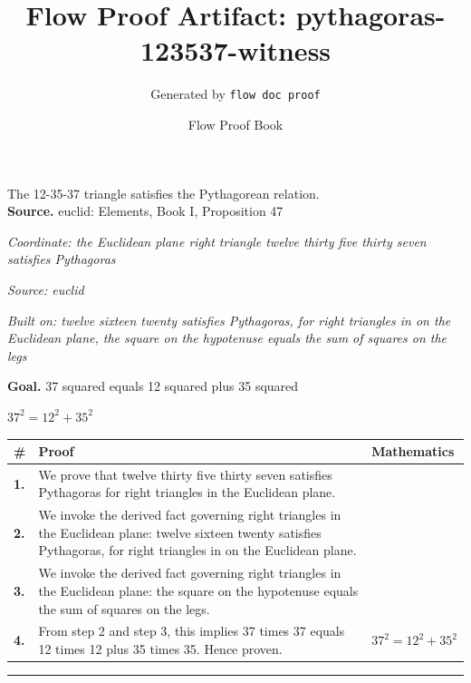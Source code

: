 \documentclass[11pt]{article}
\title{Flow Proof Artifact: pythagoras-123537-witness}
\author{Generated by \texttt{flow doc proof}}
\date{Flow Proof Book}
\theoremstyle{definition}
\begin{document}
\maketitle
The 12-35-37 triangle satisfies the Pythagorean relation.\\[0.5em]
\textbf{Source.} euclid: Elements, Book I, Proposition 47\\[0.5em]
\bigskip
{}\par
\smallskip\noindent\textit{Coordinate: the Euclidean plane \cdot right triangle \cdot twelve thirty five thirty seven satisfies Pythagoras}\par
\smallskip\noindent\textit{Source: euclid}\par
\smallskip\noindent\textit{Built on: twelve sixteen twenty satisfies Pythagoras, for right triangles in on the Euclidean plane, the square on the hypotenuse equals the sum of squares on the legs}\par
\medskip
\noindent\textbf{Goal.} 37 squared equals 12 squared plus 35 squared\par
\noindent$\displaystyle 37^{2} = 12^{2} + 35^{2}$\par
\medskip
\noindent
\begin{tabular}{@{} >{\raggedright\arraybackslash}p{} >{\raggedright\arraybackslash}p{} >{\raggedleft\arraybackslash}p{} @{}}
\textbf{\#} & \textbf{Proof} & \textbf{Mathematics} \\
\midrule
\textbf{1.} & We prove that twelve thirty five thirty seven satisfies Pythagoras for right triangles in the Euclidean plane. & \\[0.45em]
\textbf{2.} & We invoke the derived fact governing right triangles in the Euclidean plane: twelve sixteen twenty satisfies Pythagoras, for right triangles in on the Euclidean plane. & \\[0.45em]
\textbf{3.} & We invoke the derived fact governing right triangles in the Euclidean plane: the square on the hypotenuse equals the sum of squares on the legs. & \\[0.45em]
\textbf{4.} & From step 2 and step 3, this implies 37 times 37 equals 12 times 12 plus 35 times 35. Hence proven. & $\displaystyle 37^{2} = 12^{2} + 35^{2}$ \\[0.45em]
\bottomrule
\end{tabular}
\label{thm:Geometry-right triangle-twelve_thirty_five_thirty_seven_satisfies_pythagoras}
\par\medskip\hrule
\end{document}
